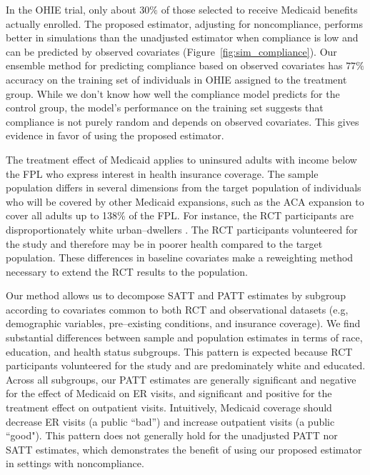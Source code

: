 \documentclass[12pt]{article}
\begin{document}
In the OHIE trial, only about $30\%$ of those selected to receive Medicaid benefits actually enrolled. The proposed estimator, adjusting for noncompliance, performs better in simulations than the unadjusted estimator when compliance is low and can be predicted by observed covariates (Figure~\ref{fig:sim_compliance}).  Our ensemble method for predicting compliance based on observed covariates has $77\%$ accuracy on the training set of individuals in OHIE assigned to the treatment group.  While we don't know how well the compliance model predicts for the control group, the model's performance on the training set suggests that compliance is not purely random and depends on observed covariates.  This gives evidence in favor of using the proposed estimator.  

The treatment effect of Medicaid applies to uninsured adults with income below the FPL who express interest in health insurance coverage. The sample population differs in several dimensions from the target population of individuals who will be covered by other Medicaid expansions, such as the ACA expansion to cover all adults up to 138\% of the FPL. For instance, the RCT participants are disproportionately white urban--dwellers \citep{Taubman}. The RCT participants volunteered for the study and therefore may be in poorer health compared to the target population. These differences in baseline covariates make a reweighting method necessary to extend the RCT results to the population. 

Our method allows us to decompose SATT and PATT estimates by subgroup according to covariates common to both RCT and observational datasets (e.g, demographic variables, pre--existing conditions, and insurance coverage). We find substantial differences between sample and population estimates in terms of race, education, and health status subgroups. This pattern is expected because RCT participants volunteered for the study and are predominately white and educated.  Across all subgroups, our PATT estimates are generally significant and negative for the effect of Medicaid on ER visits, and significant and positive for the treatment effect on outpatient visits. Intuitively, Medicaid coverage should decrease ER visits (a public ``bad'') and increase outpatient visits (a public ``good"). This pattern does not generally hold for the unadjusted PATT nor SATT estimates, which demonstrates the benefit of using our proposed estimator in settings with noncompliance. 

\pagebreak
\end{document}
